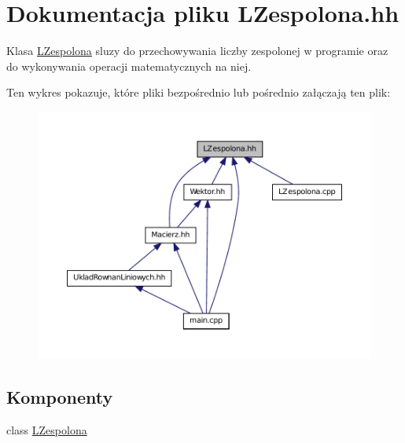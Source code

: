 \hypertarget{_l_zespolona_8hh}{
\section{Dokumentacja pliku LZespolona.hh}
\label{_l_zespolona_8hh}
}


Klasa \hyperlink{class_l_zespolona}{LZespolona} sluzy do przechowywania liczby zespolonej w programie oraz do wykonywania operacji matematycznych na niej.  


Ten wykres pokazuje, które pliki bezpośrednio lub pośrednio załączają ten plik:\nopagebreak
\begin{figure}[H]
\begin{center}
\leavevmode
\includegraphics[width=400pt]{_l_zespolona_8hh__dep__incl}
\end{center}
\end{figure}
\subsection*{Komponenty}
\begin{DoxyCompactItemize}
\item 
class \hyperlink{class_l_zespolona}{LZespolona}
\end{DoxyCompactItemize}
